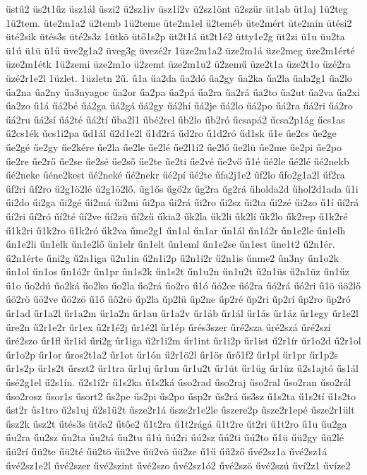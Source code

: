 {üstű2
üs2t1űz
üsz1ál
üszi2
ü2sz1iv
üsz1í2v
ü2sz1önt
ü2szür
üt1ab
üt1aj
1ü2teg
1ü2tem.
üte2m1a2
ü2temb
1ü2teme
üte2m1el
ü2teméb
üte2mért
üte2min
ütési2
üté2sik
ütés3s
üté2s3z
1ütkö
ütő1s2p
üt2t1á
üt2t1é2
ütty1e2g
üt2zi
ü1u
üu2ta
ü1ú
ü1ü
ü1ű
üve2g1a2
üveg3g
üvezé2r
1üze2m1a2
üze2m1á
üze2meg
üze2m1érté
üze2m1étk
1ü2zemi
üze2m1o
ü2zemt
üze2m1u2
ü2zemű
üze2t1a
üze2t1o
üzé2ra
üzé2r1e2l
1üzlet.
1üzletn
2ű.
ű1a
űa2da
űa2dó
űa2gy
űa2ka
űa2la
űala2g1
űa2lo
űa2na
űa2ny
űa3nyagoc
űa2or
űa2pa
űa2pá
űa2ra
űa2rá
űa2to
űa2ut
űa2va
űa2xi
űa2zo
ű1á
űá2bé
űá2ga
űá2gá
űá2gy
űá2hí
űá2je
űá2lo
űá2po
űá2ra
űá2ri
űá2ro
űá2ru
űá2sí
űá2té
űá2tí
űba2l1
űbé2rel
űb2lo
űb2ró
űcsapá2
űcsa2p1ág
űcs1as
ű2cs1ék
űcs1i2pa
űd1ál
ű2d1e2l
ű1d2rá
űd2ro
ű1d2ró
űd1sk
ű1e
űe2cs
űe2ge
űe2gé
űe2gy
űe2kére
űe2la
űe2le
űe2lé
űe2l1í2
űe2lő
űe2lü
űe2me
űe2pi
űe2po
űe2re
űe2rő
űe2se
űe2sé
űe2ső
űe2te
űe2ti
űe2vé
űe2vő
ű1é
űé2le
űé2lé
űé2nekb
űé2neke
űéne2kest
űé2neké
űé2nekr
űé2pí
űé2te
űfa2j1e2
űf2lo
űfo2g1a2l
űf2ra
űf2ri
űf2ro
ű2g1ö2lé
ű2g1ö2lő.
űg1ős
űgő2z
űg2ra
űg2rá
űholda2d
űhol2d1ada
ű1i
űi2do
űi2ga
űi2gé
űi2má
űi2mi
űi2pa
űi2rá
űi2ro
űi2sz
űi2ta
űi2zé
űi2zo
ű1í
űí2rá
űí2ri
űí2ró
űí2té
űí2ve
űí2zü
űí2zű
űkia2
űk2la
űk2li
űk2lí
űk2lo
űk2rep
ű1k2ré
ű1k2ri
ű1k2ro
ű1k2ró
űk2va
űme2g1
űn1al
űn1ar
űn1ál
űn1á2r
űn1e2le
űn1elh
űn1e2li
űn1elk
űn1e2lő
űn1elr
űn1elt
űn1eml
űn1e2se
űn1est
űne1t2
ű2n1ér.
ű2n1érte
űni2g
ű2n1iga
ű2n1in
ű2n1i2p
ű2n1i2r
ű2n1is
űnme2
űn3ny
űn1o2k
űn1ol
űn1os
űn1ó2r
űn1pr
űn1s2k
űn1s2t
űn1u2n
űn1u2t
ű2n1üs
ű2n1üz
űn1űz
ű1o
űo2dú
űo2ká
űo2ko
űo2la
űo2rá
űo2ro
ű1ó
űó2ce
űó2ra
űó2rá
űó2ri
ű1ö
űö2lő
űö2rö
űö2ve
űö2zö
ű1ő
űő2rö
űp2la
űp2lü
űp2ne
űp2ré
űp2ri
űp2rí
űp2ro
űp2ró
űr1ad
űr1a2l
űr1a2m
űr1a2n
űr1au
űr1a2v
űr1áb
űr1ál
űr1ás
űr1áz
űr1egy
űr1e2l
űre2n
ű2r1e2r
űr1ex
ű2r1é2j
űr1é2l
űr1ép
űrés3szer
űré2sza
űré2szá
űré2szí
űré2szo
űr1fl
űr1id
űri2g
űr1iga
ű2r1i2m
űr1int
űr1i2p
űr1ist
ű2r1ír
űr1o2d
ű2r1ol
űr1o2p
űr1or
űros2t1a2
űr1ot
űr1ón
ű2r1ö2l
űr1ör
űrő1f2
űr1pl
űr1pr
űr1p2s
űr1s2p
űr1s2t
űrszt2
űr1tra
űr1uj
űr1un
űr1u2t
űr1út
űr1üg
űr1üz
ű2s1ajtó
űs1ál
űsé2g1el
ű2s1ín.
ű2s1í2r
ű1s2ka
ű1s2ká
űso2rad
űso2raj
űso2ral
űso2ran
űso2rál
űso2rosz
űsor1s
űsort2
űs2pe
űs2pi
űs2po
űsp2r
űs2rá
űs3sz
ű1s2ta
ű1s2tí
ű1s2to
űst2r
űs1tro
ű2s1uj
ű2s1ü2t
űsze2r1á
űsze2r1e2le
űszere2p
űsze2r1epé
űsze2r1ült
űsz2k
űsz2t
űtés3s
űtőa2
űtőe2
ű1t2ra
ű1t2rágá
ű1t2re
űt2ri
ű1t2ro
ű1u
űu2ga
űu2ra
űu2sz
űu2ta
űu2tá
űu2tu
ű1ú
űú2ri
űú2sz
űú2ti
űú2to
ű1ü
űü2gy
űü2lé
űü2rí
űü2te
űü2té
űü2tö
űü2ve
űü2vö
űü2ze
ű1ű
űű2ző
űvé2sz1a
űvé2sz1á
űvé2sz1e2l
űvé2szer
űvé2szint
űvé2szo
űvé2sz1ó2
űvé2szö
űvé2szú
űví2z1
űvíze2
}
